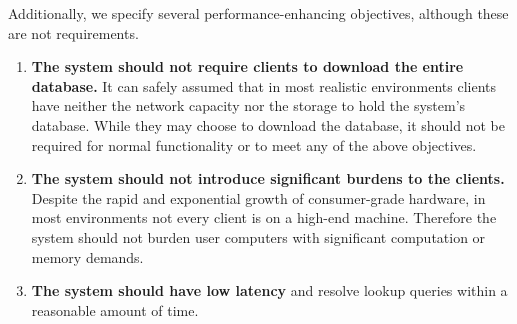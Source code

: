 Additionally, we specify several performance-enhancing objectives, although these are not requirements.

\begin{enumerate}
	\item \textbf{The system should not require clients to download the entire database.} It can safely assumed that in most realistic environments clients have neither the network capacity nor the storage to hold the system's database. While they may choose to download the database, it should not be required for normal functionality or to meet any of the above objectives.
	\item \textbf{The system should not introduce significant burdens to the clients.} Despite the rapid and exponential growth of consumer-grade hardware, in most environments not every client is on a high-end machine. Therefore the system should not burden user computers with significant computation or memory demands.
	\item \textbf{The system should have low latency} and resolve lookup queries within a reasonable amount of time.
\end{enumerate}
